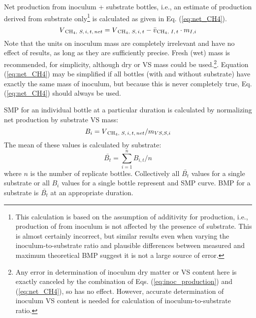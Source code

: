 \documentclass[]{article}
\begin{document}
Net  production from inoculum + substrate bottles, i.e., an estimate of  production derived from substrate only\footnote{This calculation is based on the assumption of additivity for  production, i.e., production of  from inoculum is not affected by the presence of substrate. This is almost certainly incorrect, but similar results even when varying the inoculum-to-substrate ratio and plausible differences between measured and maximum theoretical BMP suggest it is not a large source of error.} is calculated as given in Eq. (\ref{eq:net_CH4}).
\begin{equation}
  \label{eq:net_CH4}
  V\textsubscript{CH$_4$, $S, i, t, net$} = V\textsubscript{CH$_4$, $S, i, t$} - \bar{v}\textsubscript{{CH$_4$, $I, t$}} \cdot m_{I, i}
\end{equation}
Note that the units on inoculum mass are completely irrelevant and have no effect of results, as long as they are sufficiently precise.
Fresh (wet) mass is recommended, for simplicity, although dry or VS mass could be used.\footnote{Any error in determination of inoculum dry matter or VS content here is exactly canceled by the combination of Eqs. (\ref{eq:inoc_production}) and (\ref{eq:net_CH4}), so has no effect. However, accurate determination of inoculum VS content is needed for calculation of inoculum-to-substrate ratio.}.
Equation (\ref{eq:net_CH4}) may be simplified if all bottles (with and without substrate) have exactly the same mass of inoculum, but because this is never completely true, Eq. (\ref{eq:net_CH4}) should always be used. 

SMP for an individual bottle at a particular duration is calculated by normalizing net  production by substrate VS mass:
\begin{equation}
  \label{eq:yield}
  B_{i} = V\textsubscript{CH$_4$, $S, i, t, net$} / m_{VS, S, i}
\end{equation}
The mean of these values is calculated by substrate:
\begin{equation}
  \label{eq:BMP}
  \bar{B_t} = \sum_{i = 1} ^n B_{i, t} / n
\end{equation}
where $n$ is the number of replicate bottles.
Collectively all $\bar{B_t}$ values for a single substrate or all $B_{i}$ values for a single bottle represent and SMP curve.
BMP for a substrate is $\bar{B_t}$ at an appropriate duration.
\end{document}
